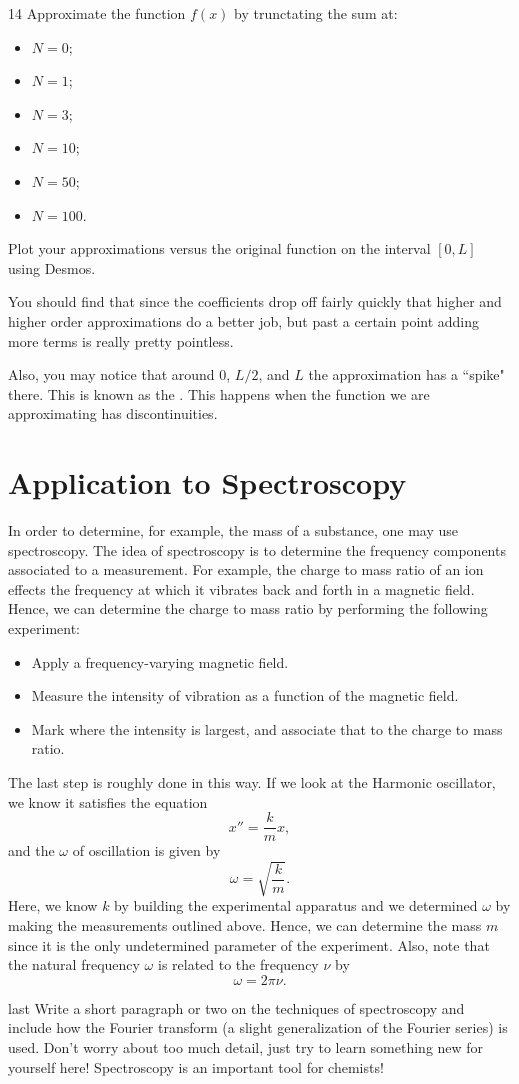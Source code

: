 \documentclass{article}
\begin{document}
\begin{problem}{}{14}
Approximate the function $f(x)$ by trunctating the sum at:
\begin{itemize}
    \item $N=0$;
    \item $N=1$;
    \item $N=3$;
    \item $N=10$;
    \item $N=50$;
    \item $N=100$.
\end{itemize}
Plot your approximations versus the original function on the interval $[0,L]$ using Desmos.
\end{problem}

You should find that since the coefficients drop off fairly quickly that higher and higher order approximations do a better job, but past a certain point adding more terms is really pretty pointless.

Also, you may notice that around $0$, $L/2$, and $L$ the approximation has a ``spike" there.  This is known as the .  This happens when the function we are approximating has discontinuities. 

\section{Application to Spectroscopy}

In order to determine, for example, the mass of a substance, one may use spectroscopy.  The idea of spectroscopy is to determine the frequency components associated to a measurement.  For example, the charge to mass ratio of an ion effects the frequency at which it vibrates back and forth in a magnetic field. Hence, we can determine the charge to mass ratio by performing the following experiment:
\begin{itemize}
    \item Apply a frequency-varying magnetic field.
    \item Measure the intensity of vibration as a function of the magnetic field.
    \item Mark where the intensity is largest, and associate that to the charge to mass ratio.
\end{itemize}
The last step is roughly done in this way. If we look at the Harmonic oscillator, we know it satisfies the equation
\[
x''=\frac{k}{m}x,
\]
and the  $\omega$ of oscillation is given by 
\[
\omega=\sqrt{\frac{k}{m}}.
\]
Here, we know $k$ by building the experimental apparatus and we determined $\omega$ by making the measurements outlined above. Hence, we can determine the mass $m$ since it is the only undetermined parameter of the experiment. Also, note that the natural frequency $\omega$ is related to the frequency $\nu$ by
\[
\omega = 2\pi \nu.
\]

\begin{problem}{}{last}
Write a short paragraph or two on the techniques of spectroscopy and include how the Fourier transform (a slight generalization of the Fourier series) is used. Don't worry about too much detail, just try to learn something new for yourself here! Spectroscopy is an important tool for chemists!
\end{problem}
\end{document}
